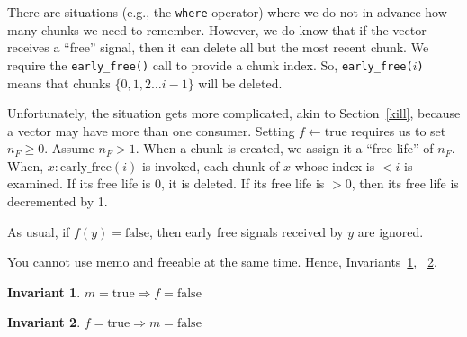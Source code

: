 \documentclass[letterpaper,12pt]{article}
\newtheorem{invariant}{Invariant}
\begin{document}
There are situations (e.g., the {\tt where} operator) where we do not 
in advance how many chunks we need to remember. However, we do know 
that if the vector receives a ``free'' signal, then it can delete all but the
most recent chunk. We require the {\tt early\_free()} call to provide a chunk index.
So, {\tt early\_free(\(i\))} means that chunks \(\{0, 1, 2 \ldots i-1\}\) 
will be deleted.  

Unfortunately, the situation gets more complicated, akin to Section~\ref{kill},
because a vector may have more than one consumer. Setting \(f \leftarrow
\mathrm{true}\) requires us to set \(n_F \geq 0\). Assume \(n_F > 1\). When a
chunk is created, we assign it a ``free-life'' of \(n_F\). When,
\(x:\mathrm{early\_free}(i)\) is invoked, each chunk of \(x\) whose index is \(< i\) is
examined. If its free life is 0, it is deleted. If its free life is \(> 0\),
then its free life is decremented by 1.

As usual, if \(f(y) = \mathrm{false}\), then early free signals received by \(y\) are ignored.

You cannot use memo and freeable at the same time. 
Hence, Invariants~\ref{f_3}, ~\ref{f_4}.

\begin{invariant}
\label{f_3}
  \(m = \mathrm{true} \Rightarrow f = \mathrm{false}\)
\end{invariant}

\begin{invariant}
\label{f_4}
  \(f = \mathrm{true} \Rightarrow m = \mathrm{false}\)
\end{invariant}

\end{document}
